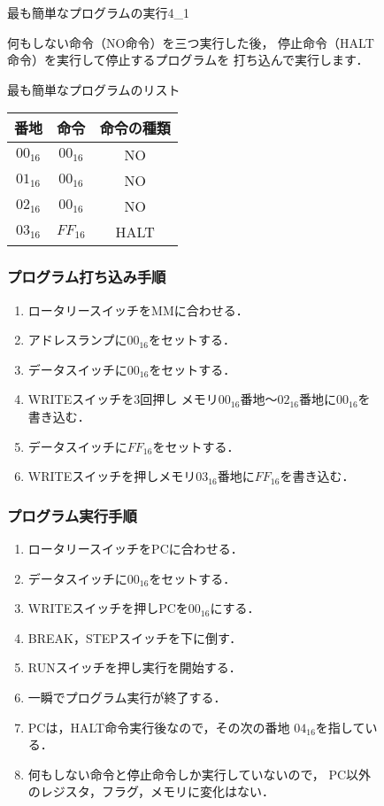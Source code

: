 \begin{figure}[tb]
  \begin{rei}{最も簡単なプログラムの実行}{4_1}

    何もしない命令（NO命令）を三つ実行した後，
    停止命令（HALT命令）を実行して停止するプログラムを
    打ち込んで実行します．

    {\ttfamily\small\begin{center}
      最も簡単なプログラムのリスト
      \begin{tabular}{|c|c|c|} \hline
        番地 & 命令 & 命令の種類\\
        \hline
        $00_{16}$ & $00_{16}$ & NO \\
        $01_{16}$ & $00_{16}$ & NO \\
        $02_{16}$ & $00_{16}$ & NO \\
        $03_{16}$ & $FF_{16}$ & HALT \\
        \hline
      \end{tabular}
    \end{center}}

    \subsubsection{プログラム打ち込み手順}

    \begin{enumerate}
    \item ロータリースイッチをMMに合わせる．
    \item アドレスランプに$00_{16}$をセットする．
    \item データスイッチに$00_{16}$をセットする．
    \item WRITEスイッチを3回押し
      メモリ$00_{16}$番地〜$02_{16}$番地に$00_{16}$を書き込む．
    \item データスイッチに$FF_{16}$をセットする．
    \item WRITEスイッチを押しメモリ$03_{16}$番地に$FF_{16}$を書き込む．
    \end{enumerate}

    \subsubsection{プログラム実行手順}

    \begin{enumerate}
    \item ロータリースイッチをPCに合わせる．
    \item データスイッチに$00_{16}$をセットする．
    \item WRITEスイッチを押しPCを$00_{16}$にする．
    \item BREAK，STEPスイッチを下に倒す．
    \item RUNスイッチを押し実行を開始する．
    \item 一瞬でプログラム実行が終了する．
    \item PCは，HALT命令実行後なので，その次の番地 $04_{16}$を指している．
    \item 何もしない命令と停止命令しか実行していないので，
      PC以外のレジスタ，フラグ，メモリに変化はない．
    \end{enumerate}


\end{rei}
\end{figure}
